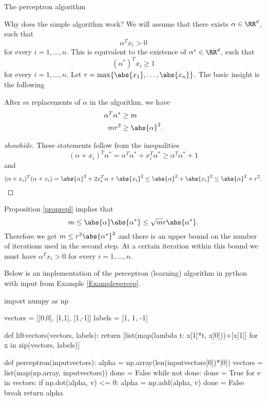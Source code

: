 \documentclass{article}
\begin{document}
\begin{hideinbutton}{The perceptron algorithm}
\begin{hideinbutton}{Why does the simple algorithm work?}
  We will assume that there exists $\alpha\in \RR^d$, such that
  $$
  \alpha^T x_i > 0
  $$
  for every $i = 1, \dots, n$. This is equivalent to the existence of $\alpha^*\in \RR^d$, such that
  $$
  (\alpha^*)^T x_i \geq 1
  $$
  for every $i = 1, \dots, n$. Let $r = \max\{\abs{x_1}, \dots, \abs{x_n}\}$. The basic insight
  is the following
  \begin{proposition}\label{proprepl}
    After $m$ replacements of $\alpha$ in the algorithm, we have
    \begin{align*}
      \alpha^T \alpha^* &\geq m \\
      m r^2 &\geq \abs{\alpha}^2.
    \end{align*}
  \end{proposition}
  \begin{proof}[showhide]
    These statements follow from the inequalities
    $$
    (\alpha + x_i)^T \alpha^* = \alpha^T \alpha^* + x_i^T \alpha^* \geq \alpha^T \alpha^* + 1
    $$
    and
    $$
    (\alpha + x_i)^T (\alpha + x_i) = \abs{\alpha}^2 + 2 x_i^T \alpha + \abs{x_i}^2 \leq \abs{\alpha}^2 +
    \abs{x_i}^2 \leq \abs{\alpha}^2 + r^2.
    $$
  \end{proof}

  Proposition \ref{proprepl} implies that
$$
m \leq \abs{\alpha} \abs{\alpha^*} \leq \sqrt{m} r \abs{\alpha^*}.
$$
Therefore we get $m\leq r^2 \abs{\alpha^*}^2$ and there is an upper bound on the number of
iterations used in the second step. At a certain iteration within this bound
we must have $\alpha^T x_i > 0$ for every $i=1, \dots, n$.
\end{hideinbutton}

Below is an implementation of the perceptron (learning) algorithm
in python with input from Example \ref{Examplepercep}.

\begin{sage}
import numpy as np

vectors = [[0,0], [1,1], [1,-1]]
labels = [1, 1, -1]

def liftvectors(vectors, labels):
    return [list(map(lambda t: x[1]*t, x[0]))+[x[1]] for x in zip(vectors, labels)]

def perceptron(inputvectors):
    alpha = np.array(len(inputvectors[0])*[0])
    vectors = list(map(np.array, inputvectors))
    done = False
    while not done:
        done = True
        for v in vectors:
            if np.dot(alpha, v) <= 0:
               alpha = np.add(alpha, v)  
               done = False
               break
    return alpha


\end{sage}
\end{hideinbutton}
\end{document}
